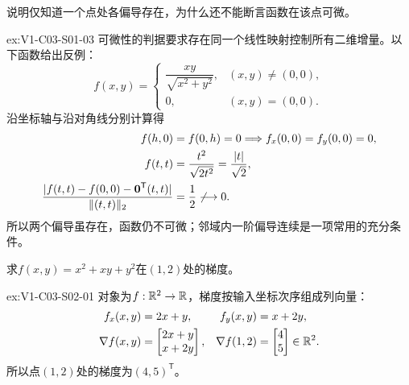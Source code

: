 \begin{SLChapterExercisePairSection}
\begin{exercise}[偏导存在与可微]\label{ex:V1-C03-S01-03}
说明仅知道一个点处各偏导存在，为什么还不能断言函数在该点可微。
\end{exercise}
\label{sol:V1-C03-S01-03}
\begin{chapterexercisesolution}{ex:V1-C03-S01-03}
可微性的判据要求存在同一个线性映射控制所有二维增量。以下函数给出反例：
\[
f(x,y)=
\begin{cases}
\dfrac{xy}{\sqrt{x^2+y^2}},&(x,y)\ne(0,0),\\[3pt]
0,&(x,y)=(0,0).
\end{cases}
\]
沿坐标轴与沿对角线分别计算得
\[
\begin{aligned}
f(h,0)&=f(0,h)=0
\Longrightarrow f_x(0,0)=f_y(0,0)=0,\\
f(t,t)&=\frac{t^2}{\sqrt{2t^2}}=\frac{|t|}{\sqrt2},\\
\frac{|f(t,t)-f(0,0)-\boldsymbol0^{\mathsf T}(t,t)|}
{\lVert(t,t)\rVert_2}&=\frac12\not\longrightarrow0.
\end{aligned}
\]
所以两个偏导虽存在，函数仍不可微；邻域内一阶偏导连续是一项常用的充分条件。
\end{chapterexercisesolution}

\begin{exercise}[梯度]\label{ex:V1-C03-S02-01}
求$f(x,y)=x^2+xy+y^2$在$(1,2)$处的梯度。
\end{exercise}
\label{sol:V1-C03-S02-01}
\begin{chapterexercisesolution}{ex:V1-C03-S02-01}
对象为$f:\mathbb{R}^2\to\mathbb{R}$，梯度按输入坐标次序组成列向量：
\[
\begin{aligned}
f_x(x,y)&=2x+y,
&f_y(x,y)&=x+2y,\\
\nabla f(x,y)&=\begin{bmatrix}2x+y\\x+2y\end{bmatrix},
&\nabla f(1,2)&=\begin{bmatrix}4\\5\end{bmatrix}\in\mathbb{R}^2.
\end{aligned}
\]
所以点$(1,2)$处的梯度为$(4,5)^{\mathsf T}$。
\end{chapterexercisesolution}


\end{SLChapterExercisePairSection}
